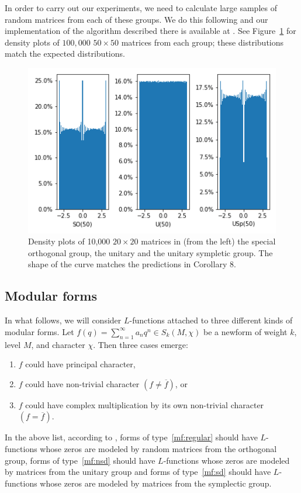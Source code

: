 \documentclass[11pt]{amsart}
\begin{document}
In order to carry out our experiments, we need to calculate large samples of random matrices from each of these groups.  We do this following \cite{mezzadri} and our implementation of the algorithm described there is available at \cite{code}.  See Figure~\ref{fig:densities} for density plots of $100,000$ $50\times 50$ matrices from each group; these distributions match the expected distributions.
\begin{figure}
\includegraphics[width=.7\textwidth]{images/distributions.png}
\caption{Density plots of 10,000 $20\times 20$ matrices in (from the left) the special orthogonal group, the unitary and the unitary sympletic group.  The shape of the curve matches the predictions in Corollary 8.}\label{fig:densities}
\end{figure}


\subsection{Modular forms}

In what follows, we will consider $L$-functions attached to three different kinds of modular forms.  Let $f(q) = \sum_{n=1}^\infty a_nq^n \in S_k(M, \chi)$ be a newform of weight $k$, level $M$, and character $\chi$. Then three cases emerge:  \begin{enumerate}
\item\label{mf:regular} $f$ could have principal character, 
\item\label{mf:nsd} $f$ could have non-trivial character $(f\neq \overline{f})$, or
\item\label{mf:sd} $f$ could have complex multiplication by its own non-trivial character $(f=\overline{f})$.  
\end{enumerate}
In the above list, according to \cite{bm}, forms of type~\ref{mf:regular} should have $L$-functions whose zeros are modeled by random matrices from the orthogonal group, forms of type~\ref{mf:nsd} should have $L$-functions whose zeros are modeled by matrices from the unitary group and forms of type~\ref{mf:sd} should have $L$-functions whose zeros are modeled by matrices from the symplectic group.  
\end{document}
